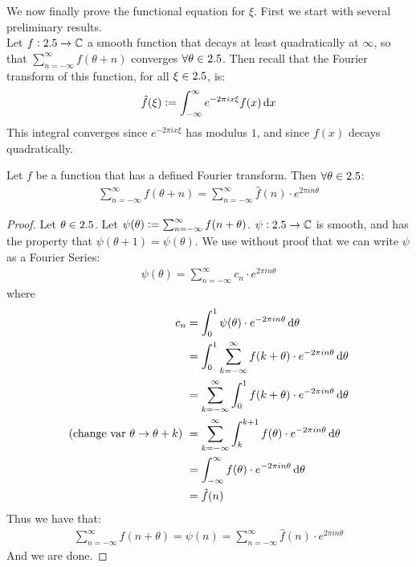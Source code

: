 \setcounter{section}{0}
\setcounter{theorem}{0}



We now finally prove the functional equation for $\xi$. First we start with several preliminary results.\\

Let $f: 2.5 \to \mathbb{C}$ a smooth function that decays at least quadratically at $\infty$, so that $\sum_{n=-\infty}^{\infty} f(\theta+n)$ converges $\forall \theta \in 2.5$. Then recall that the Fourier transform of this function, for all $\xi \in 2.5$, is:
\begin{align*}
    \hat{f}(\xi) \defas \int_{-\infty}^\infty e^{-2 \pi i x \xi} f(x) \dif x
\end{align*}
This integral converges since $e^{-2 \pi i x \xi}$ has modulus $1$, and since $f(x)$ decays quadratically.

\begin{proposition}
Let $f$ be a function that has a defined Fourier transform. Then $\forall \theta \in 2.5$:
\begin{align*}
    \sum_{n=-\infty}^\infty f(\theta + n) = \sum_{n=-\infty}^\infty \hat{f}(n) \cdot e^{2 \pi i n \theta}
\end{align*}
\end{proposition}
\begin{proof}
Let $\theta \in 2.5$. Let $\psi(\theta) \vcentcolon = \sum_{n=-\infty}^{\infty} f(n+\theta)$. $\psi : 2.5 \to \mathbb{C}$ is smooth, and has the property that $\psi(\theta+1) = \psi(\theta) $. We use without proof that we can write $\psi$ as a Fourier Series:
\begin{align*}
    \psi(\theta) = \sum_{n=-\infty}^{\infty} c_n \cdot e^{2 \pi i n \theta}
\end{align*}
where
\begin{align*}
    c_n &= \int_0^1 \psi(\theta) \cdot e^{-2 \pi i n \theta} \dif \theta \\ &= \int_0^1 \sum_{k=-\infty}^{\infty} f(k+\theta) \cdot e^{-2 \pi i n \theta} \dif \theta \\&=  \sum_{k=-\infty}^{\infty} \int_0^1 f(k+\theta) \cdot e^{-2 \pi i n \theta} \dif \theta \\ \text{(change var $\theta \to \theta +k$) } &= \sum_{k=-\infty}^{\infty} \int_k^{k+1} f(\theta) \cdot e^{-2 \pi i n \theta} \dif \theta \\
    &= \int_{-\infty}^{\infty} f(\theta) \cdot e^{-2 \pi i n \theta} \dif \theta \\&= \hat{f}(n)
\end{align*}
Thus we have that:
\begin{align*}
    \sum_{n=-\infty}^{\infty} f(n+\theta) = \psi(n) = \sum_{n=-\infty}^{\infty} \hat{f}(n) \cdot e^{2 \pi i n \theta}
\end{align*}
And we are done.
\end{proof}

